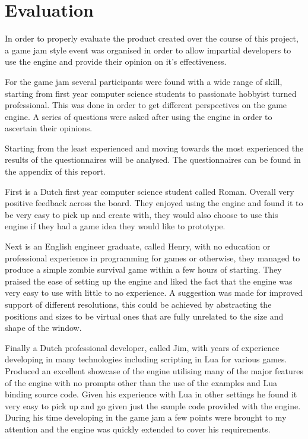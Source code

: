 \documentclass[11pt,a4paper,titlepage]{report}
\begin{document}
\chapter{Evaluation}


	In order to properly evaluate the product created over the course of this project, a game jam style event was organised in order to allow impartial developers to use the engine and provide their opinion on it's effectiveness.
	

	For the game jam several participants were found with a wide range of skill, starting from first year computer science students to passionate hobbyist turned professional. This was done in order to get different perspectives on the game engine. A series of questions were asked after using the engine in order to ascertain their opinions.

	Starting from the least experienced and moving towards the most experienced the results of the questionnaires will be analysed. The questionnaires can be found in the appendix of this report.

	First is a Dutch first year computer science student called Roman. Overall very positive feedback across the board. They enjoyed using the engine and found it to be very easy to pick up and create with, they would also choose to use this engine if they had a game idea they would like to prototype.

	Next is an English engineer graduate, called Henry, with no education or professional experience in programming for games or otherwise, they managed to produce a simple zombie survival game within a few hours of starting. They praised the ease of setting up the engine and liked the fact that the engine was very easy to use with little to no experience. A suggestion was made for improved support of different resolutions, this could be achieved by abstracting the positions and sizes to be virtual ones that are fully unrelated to the size and shape of the window.

	Finally a Dutch professional developer, called Jim, with years of experience developing in many technologies including scripting in Lua for various games. Produced an excellent showcase of the engine utilising many of the major features of the engine with no prompts other than the use of the examples and Lua binding source code. Given his experience with Lua in other settings he found it very easy to pick up and go given just the sample code provided with the engine. During his time developing in the game jam a few points were brought to my attention and the engine was quickly extended to cover his requirements.
\end{document}
